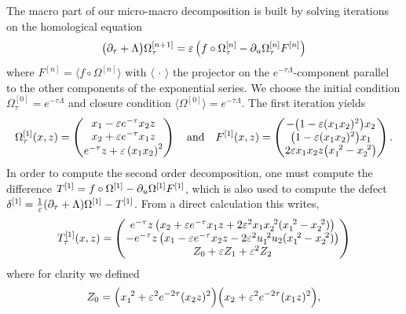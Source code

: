 The macro part of our micro-macro decomposition is built by solving iterations on the homological equation
\begin{equation} \label{subsec:oscill:eq:homol_test}
\big( \partial_{\tau} + \Lambda \big) \Omega^{[n+1]}_{\tau} 
= \varepsilon \left( f \circ \Omega^{[n]}_{\tau} - \partial_{u} \Omega^{[n]}_{\tau} F^{[n]} \right) 
\end{equation}
where $F^{[n]} = \big \langle f \circ \Omega^{[n]} \big\rangle$ 
with $\langle \, \cdot \, \rangle$ the projector on the $e^{-\tau \Lambda}$-component 
parallel to the other components of the exponential series. 
We choose the initial condition $\Omega^{[0]}_{\tau} = e^{-\tau \Lambda}$ 
and closure condition $\langle \Omega^{[0]} \rangle = e^{-\tau \Lambda}$. 
%
The first iteration yields 
\begin{equation*}
\Omega^{[1]}_{\tau}(x,z) = \begin{pmatrix}
x_1 - \varepsilon e^{-\tau} x_2 z \\
x_2 + \varepsilon e^{-\tau} x_1 z \\
e^{-\tau} z + \varepsilon \left( x_1 x_2 \right)^2 
\end{pmatrix}
\quad \text{and}\quad
F^{[1]}(x,z) = \begin{pmatrix}
-\big( 1 - \varepsilon ( x_1 x_2 )^2 \big) x_2 \\
\big(1 - \varepsilon ( x_1 x_2 )^2 \big) x_1 \\
2 \varepsilon x_1 x_2 z \big( x_1^{\ 2} - x_2^{\ 2} \big)
\end{pmatrix} . 
\end{equation*}
%
In order to compute the second order decomposition, 
one must compute the difference $T^{[1]} = f \circ \Omega^{[1]} - \partial_{u} \Omega^{[1]} F^{[1]}$, 
which is also used to compute the defect $\delta^{[1]} = \frac{1}{\varepsilon} (\partial_{\tau} + \Lambda) \Omega^{[1]} - T^{[1]}$. 
From a direct calculation this writes, 
\begin{equation*}
T^{[1]}_{\tau}(x, z) = \begin{pmatrix}
e^{-\tau} z \left( x_2 + \varepsilon e^{-\tau} x_1 z + 2 \varepsilon^2 x_1 x_2^{\ 2} (x_1^{\ 2} - x_2^{\ 2}) \right) \\
- e^{-\tau} z \left( x_1 - \varepsilon e^{-\tau} x_2 z - 2 \varepsilon^2 u_1^{\ 2} u_2 ( x_1^{\ 2} - x_2^{\ 2}) \right) \\
Z_0 + \varepsilon Z_1 + \varepsilon^2 Z_2
\end{pmatrix}
\end{equation*}
where for clarity we defined 
\begin{equation*}
Z_0 = \Big( x_1^{\ 2} + \varepsilon^2 e^{-2\tau} (x_2 z)^2 \Big) \Big( x_2 + \varepsilon^2 e^{-2\tau} (x_1 z)^2 \Big) , 
\end{equation*}
